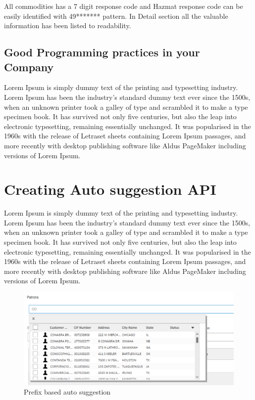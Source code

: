 \documentclass[12pt,a4paper]{report}
\begin{document}
All commodities has a 7 digit response code and Hazmat response code can be easily identified with 49******* pattern. In Detail section all the valuable information has been listed to readability.

\subsection*{Good Programming practices in your Company}
Lorem Ipsum is simply dummy text of the printing and typesetting industry. Lorem Ipsum has been the industry's standard dummy text ever since the 1500s, when an unknown printer took a galley of type and scrambled it to make a type specimen book. It has survived not only five centuries, but also the leap into electronic typesetting, remaining essentially unchanged. It was popularised in the 1960s with the release of Letraset sheets containing Lorem Ipsum passages, and more recently with desktop publishing software like Aldus PageMaker including versions of Lorem Ipsum.

\section{Creating Auto suggestion API}

Lorem Ipsum is simply dummy text of the printing and typesetting industry. Lorem Ipsum has been the industry's standard dummy text ever since the 1500s, when an unknown printer took a galley of type and scrambled it to make a type specimen book. It has survived not only five centuries, but also the leap into electronic typesetting, remaining essentially unchanged. It was popularised in the 1960s with the release of Letraset sheets containing Lorem Ipsum passages, and more recently with desktop publishing software like Aldus PageMaker including versions of Lorem Ipsum.

\begin{figure}[H]
\includegraphics[scale=.8]{PrefixSearch.png}
  \caption{Prefix based auto suggestion}
  \label{fig:PrefixSearch}
\end{figure}
\end{document}
